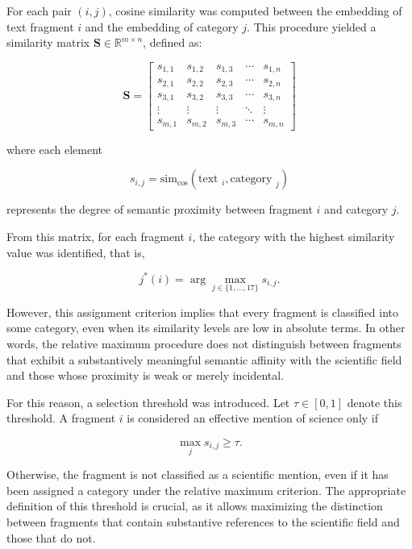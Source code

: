 \documentclass[11pt,a4paper]{article}
\begin{document}
For each pair $(i,j)$, cosine similarity was computed between the embedding of text fragment $i$ and the embedding of category $j$. This procedure yielded a similarity matrix $\mathbf{S} \in \mathbb{R}^{m \times n}$, defined as:

\begin{equation}
	\mathbf{S} =
	\begin{bmatrix}
		s_{1,1} & s_{1,2} & s_{1,3} & \cdots & s_{1,n} \\
		s_{2,1} & s_{2,2} & s_{2,3} & \cdots & s_{2,n} \\
		s_{3,1} & s_{3,2} & s_{3,3} & \cdots & s_{3,n} \\
		\vdots  & \vdots  & \vdots  & \ddots & \vdots  \\
		s_{m,1} & s_{m,2} & s_{m,3} & \cdots & s_{m,n}
	\end{bmatrix}
\end{equation}

where each element

$$
s_{i,j} = \text{sim}_{\cos}(\text{text }_i, \text{category }_j)
$$


represents the degree of semantic proximity between fragment $i$ and category $j$.

From this matrix, for each fragment $i$, the category with the highest similarity value was identified, that is,

$$
j^*(i) = \arg\max_{j \in \{1,\dots,17\}} s_{i,j}.
$$

However, this assignment criterion implies that every fragment is classified into some category, even when its similarity levels are low in absolute terms. In other words, the relative maximum procedure does not distinguish between fragments that exhibit a substantively meaningful semantic affinity with the scientific field and those whose proximity is weak or merely incidental.


For this reason, a selection threshold was introduced. Let $\tau \in [0,1]$ denote this threshold. A fragment $i$ is considered an effective mention of science only if

$$
\max_{j} s_{i,j} \geq \tau.
$$

Otherwise, the fragment is not classified as a scientific mention, even if it has been assigned a category under the relative maximum criterion. The appropriate definition of this threshold is crucial, as it allows maximizing the distinction between fragments that contain substantive references to the scientific field and those that do not.
\end{document}
